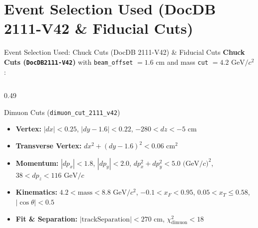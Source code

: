 \documentclass[aspectratio=169, 10pt]{beamer}
\begin{document}
\section{Event Selection Used (DocDB 2111-V42 \& Fiducial Cuts)}

\begin{frame}{Event Selection Used: Chuck Cuts (DocDB 2111-V42) \& Fiducial Cuts}
\scriptsize
\textbf{Chuck Cuts (\texttt{DocDB2111-V42})} with \texttt{beam\_offset} $= 1.6\text{ cm}$ and mass \texttt{cut} $= 4.2\text{ GeV}/c^2$:
\vspace{-0.15cm}
\begin{columns}[T, onlytextwidth]
    \begin{column}{0.49\textwidth}
        \begin{block}{\scriptsize Dimuon Cuts (\texttt{dimuon\_cut\_2111\_v42})}
            \tiny
            \begin{itemize}
                \item \textbf{Vertex:} $|dx| < 0.25$, $|dy - 1.6| < 0.22$, $-280 < dz < -5\text{ cm}$
                \item \textbf{Transverse Vertex:} $dx^2 + (dy - 1.6)^2 < 0.06\text{ cm}^2$
                \item \textbf{Momentum:} $|dp_x| < 1.8$, $|dp_y| < 2.0$, $dp_x^2 + dp_y^2 < 5.0\text{ (GeV}/c)^2$, $38 < dp_z < 116\text{ GeV}/c$
                \item \textbf{Kinematics:} $4.2 < \text{mass} < 8.8\text{ GeV}/c^2$, $-0.1 < x_F < 0.95$, $0.05 < x_T \le 0.58$, $|\cos\theta| < 0.5$
                \item \textbf{Fit \& Separation:} $|\text{trackSeparation}| < 270\text{ cm}$, $\chi^2_{\text{dimuon}} < 18$
            \end{itemize}
        \end{block}


\end{column}
\end{columns}
\end{frame}
\end{document}
